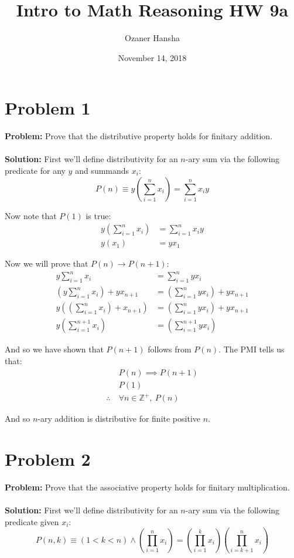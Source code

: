 \documentclass{article}
\begin{document}
\title{Intro to Math Reasoning HW 9a}
\author{Ozaner Hansha}
\date{November 14, 2018}
\maketitle

\section*{Problem 1}
\textbf{Problem:} Prove that the distributive property holds for finitary addition.
\\\\
\textbf{Solution:} First we'll define distributivity for an $n$-ary sum via the following predicate for any $y$ and summands $x_i$:
$$P(n)\equiv y\left(\sum^n_{i=1}x_i\right)=\sum^n_{i=1}x_iy$$

Now note that $P(1)$ is true:
\begin{align*}
  y\left(\sum^n_{i=1}x_i\right)&=\sum^n_{i=1}x_iy\tag*{$P(1)$}\\
  y(x_1)&=yx_1\tag{def. of $1$-ary sum}
\end{align*}

Now we will prove that $P(n)\rightarrow P(n+1)$:
\begin{align*}
  y\sum^n_{i=1}x_i&=\sum^n_{i=1}yx_i\tag{$P(n)$ given}\\
  \left(y\sum^n_{i=1}x_i\right)+yx_{n+1}&=\left(\sum^n_{i=1}yx_i\right)+yx_{n+1}\\
  y\left(\left(\sum^n_{i=1}x_i\right)+x_{n+1}\right)&=\left(\sum^n_{i=1}yx_i\right)+yx_{n+1}\tag{distrib. prop. of binary $+$}\\
  y\left(\sum^{n+1}_{i=1}x_i\right)&=\left(\sum^{n+1}_{i=1}yx_i\right)\tag{def. of $(n+1)$-ary sum}
\end{align*}

And so we have shown that $P(n+1)$ follows from $P(n)$. The PMI tells us that:
\begin{align*}
&P(n)\implies P(n+1)\\
&P(1)\\
\therefore\ &{\forall n\in \mathbb{Z}^+,\ P(n)}
\end{align*}

And so $n$-ary addition is distributive for finite positive $n$.

\section*{Problem 2}
\textbf{Problem:} Prove that the associative property holds for finitary multiplication.
\\\\
\textbf{Solution:} First we'll define distributivity for an $n$-ary sum via the following predicate given $x_i$:
$$P(n,k)\equiv(1<k<n)\wedge\left(\prod^n_{i=1}x_i\right)=\left(\prod^k_{i=1}x_i\right)\left(\prod^n_{i=k+1}x_i\right)$$
\end{document}
